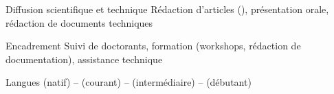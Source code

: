 \begin{cvskills}
  \cvskill
  {Diffusion scientifique et technique} %
  {Rédaction d'articles (), présentation orale, rédaction de documents techniques}

  \cvskill
  {Encadrement}
  {Suivi de doctorants, formation (workshops, rédaction de documentation), assistance technique}

  \cvskill
  {Langues} %
  { \textcolor{lighttext}{(natif)} --  \textcolor{lighttext}{(courant)}
    --  \textcolor{lighttext}{(intermédiaire)} -- 
  \textcolor{lighttext}{(débutant)}} %

\end{cvskills}
